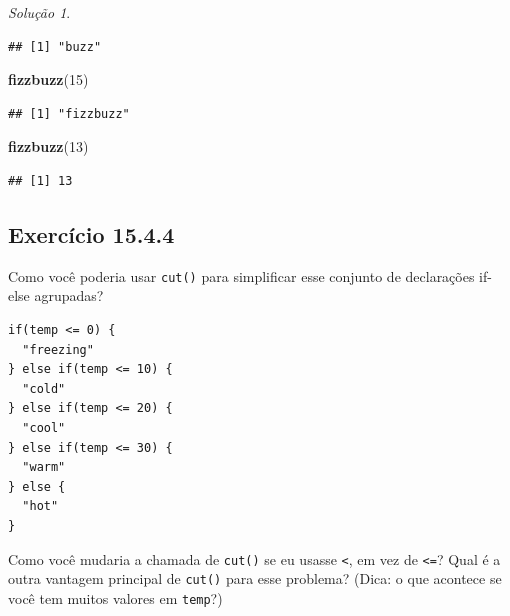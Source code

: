 \documentclass[
]{latex/krantz}
\newenvironment{Shaded}{\begin{snugshade}}{\end{snugshade}}
\newcommand{\DecValTok}[1]{\textcolor[rgb]{0.00,0.00,0.81}{#1}}
\newcommand{\FunctionTok}[1]{\textcolor[rgb]{0.13,0.29,0.53}{\textbf{#1}}}
\newcommand{\NormalTok}[1]{#1}
\theoremstyle{definition}
\theoremstyle{definition}
\theoremstyle{definition}
\theoremstyle{definition}
\theoremstyle{remark}
\newtheorem*{solution}{Solução}
\begin{document}
\begin{solution}
\begin{verbatim}
## [1] "buzz"
\end{verbatim}

\begin{Shaded}
\begin{Highlighting}[]
\FunctionTok{fizzbuzz}\NormalTok{(}\DecValTok{15}\NormalTok{)}
\end{Highlighting}
\end{Shaded}

\begin{verbatim}
## [1] "fizzbuzz"
\end{verbatim}

\begin{Shaded}
\begin{Highlighting}[]
\FunctionTok{fizzbuzz}\NormalTok{(}\DecValTok{13}\NormalTok{)}
\end{Highlighting}
\end{Shaded}

\begin{verbatim}
## [1] 13
\end{verbatim}

\end{solution}

\hypertarget{exr15-4-4}{%
\subsection*{Exercício 15.4.4}\label{exr15-4-4}}

Como você poderia usar \texttt{cut()} para simplificar esse conjunto de declarações if-else agrupadas?

\begin{verbatim}
if(temp <= 0) {
  "freezing"
} else if(temp <= 10) {
  "cold"
} else if(temp <= 20) {
  "cool"
} else if(temp <= 30) {
  "warm"
} else {
  "hot"
}
\end{verbatim}

Como você mudaria a chamada de \texttt{cut()} se eu usasse \texttt{\textless{}}, em vez de \texttt{\textless{}=}? Qual é a outra vantagem principal de \texttt{cut()} para esse problema? (Dica: o que acontece se você tem muitos valores em \texttt{temp}?)
\end{document}

